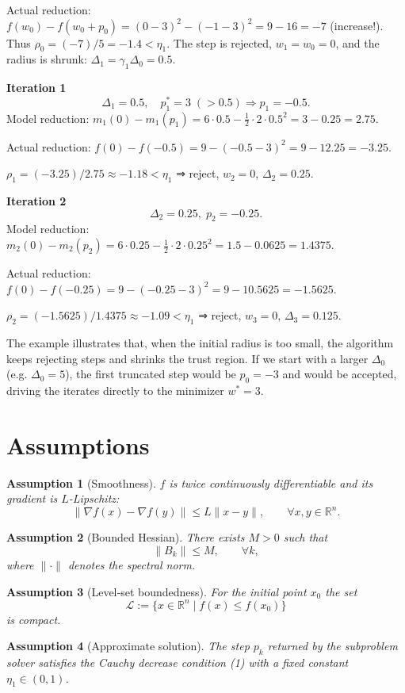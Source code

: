\documentclass{article}
\newtheorem{assumption}{Assumption}
\newcommand{\R}{\mathbb{R}}
\begin{document}
Actual reduction:
\(f(w_{0})-f(w_{0}+p_{0}) = (0-3)^{2}-( -1-3)^{2}=9-16=-7\) (increase!).
Thus
\(\rho_{0}=(-7)/5=-1.4<\eta_{1}\).
The step is rejected, \(w_{1}=w_{0}=0\), and the radius is shrunk:
\(\Delta_{1}= \gamma_{1}\Delta_{0}=0.5\).

\medskip
\textbf{Iteration 1}
\[
\Delta_{1}=0.5,\quad p_{1}^{*}=3\;(>0.5)\Rightarrow p_{1}=-0.5.
\]
Model reduction:
\(m_{1}(0)-m_{1}(p_{1}) = 6\cdot0.5-\tfrac12\cdot2\cdot0.5^{2}=3-0.25=2.75.\)

Actual reduction:
\(f(0)-f(-0.5)=9-( -0.5-3)^{2}=9-12.25=-3.25.\)

\(\rho_{1}=(-3.25)/2.75\approx-1.18<\eta_{1}\) ⇒ reject,
\(w_{2}=0\), \(\Delta_{2}=0.25\).

\medskip
\textbf{Iteration 2}
\[
\Delta_{2}=0.25,\; p_{2}=-0.25.
\]
Model reduction:
\(m_{2}(0)-m_{2}(p_{2}) = 6\cdot0.25-\tfrac12\cdot2\cdot0.25^{2}=1.5-0.0625=1.4375.\)

Actual reduction:
\(f(0)-f(-0.25)=9-( -0.25-3)^{2}=9-10.5625=-1.5625.\)

\(\rho_{2}=(-1.5625)/1.4375\approx-1.09<\eta_{1}\) ⇒ reject,
\(w_{3}=0\), \(\Delta_{3}=0.125\).

The example illustrates that, when the initial radius is too small,
the algorithm keeps rejecting steps and shrinks the trust region.
If we start with a larger \(\Delta_{0}\) (e.g. \(\Delta_{0}=5\)), the first
truncated step would be \(p_{0}= -3\) and would be accepted, driving the
iterates directly to the minimizer \(w^{*}=3\).

\newpage
\section*{Assumptions}
\begin{assumption}[Smoothness]\label{ass:smooth}
\(f\) is twice continuously differentiable and its gradient is \(L\)-Lipschitz:
\[
\|\nabla f(x)-\nabla f(y)\|\le L\|x-y\|,\qquad\forall x,y\in\R^{n}.
\]
\end{assumption}
\begin{assumption}[Bounded Hessian]\label{ass:hessian}
There exists \(M>0\) such that
\[
\|B_{k}\|\le M,\qquad\forall k,
\]
where \(\|\cdot\|\) denotes the spectral norm.
\end{assumption}
\begin{assumption}[Level‑set boundedness]\label{ass:level}
For the initial point \(x_{0}\) the set
\[
\mathcal{L}:=\{x\in\R^{n}\mid f(x)\le f(x_{0})\}
\]
is compact.
\end{assumption}
\begin{assumption}[Approximate solution]\label{ass:approx}
The step \(p_{k}\) returned by the subproblem solver satisfies the
Cauchy decrease condition (1) with a fixed constant \(\eta_{1}\in(0,1)\).
\end{assumption}
\end{document}
